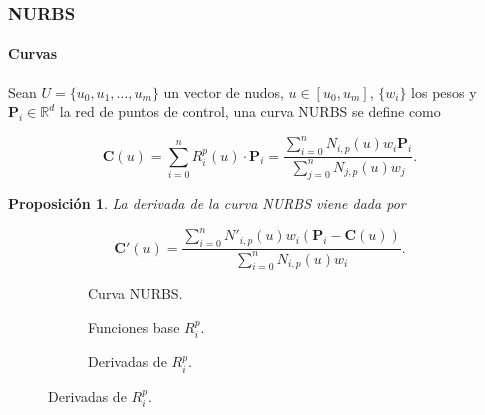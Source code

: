 \documentclass[compress]{beamer}
\newtheorem{proposition}[theorem]{Proposición}
\begin{document}
\begin{frame}
	\frametitle{NURBS}
	\framesubtitle{Curvas}
	\scriptsize 
			\vspace{-0.15cm}
	\begin{definition}
		Sean $U = \{u_0, u_1, \ldots, u_m\}$ un vector de nudos, $u \in [u_0, u_m]$, $\{w_i\}$ los pesos y $\mathbf{P}_i \in \mathbb{R}^d$ la red de puntos de control,
		una curva NURBS se define como

		\vspace{-0.3cm}

		\begin{equation}
			\label{eq:NURBS_Curve}
			\mathbf{C}(u) = \sum_{i=0}^{n} R_i^p(u) \cdot \mathbf{P}_i = \frac{\sum_{i=0}^{n} N_{i,p}(u) w_i \mathbf{P}_i}{\sum_{j=0}^{n} N_{j,p}(u) w_j}.
		\end{equation}

    \vspace{-0.4cm}
	\end{definition}

	\begin{proposition}
		La derivada de la curva NURBS viene dada por

		\vspace{-0.2cm}

		$$\mathbf{C}'(u) = \frac{\sum_{i=0}^{n} N'_{i,p}(u) w_i \left( \mathbf{P}_i - \mathbf{C}(u) \right)}{\sum_{i=0}^{n} N_{i,p}(u) w_i}.$$
		
		\vspace{-0.35cm}
	\end{proposition}
			\vspace{-0.15cm}
	\begin{figure}[H]
    \centering
    \captionsetup[subfigure]{skip=0pt} %
    \tiny
    \begin{subfigure}{0.32\textwidth}
        
        \caption{Curva NURBS.}
        \label{fig:NURBS_curva_1}   
    \end{subfigure}
    \hfill
    \begin{subfigure}{0.33\textwidth}
        
        \caption{Funciones base $R_i^p$.}
        \label{fig:NURBS_curva_2}   
    \end{subfigure}
    \hfill
    \begin{subfigure}{0.32\textwidth}
        
        \caption{Derivadas de  $R_i^p$.}
        \label{fig:NURBS_curva_3}   
    \end{subfigure}
\end{figure}
\end{frame}
\end{document}
